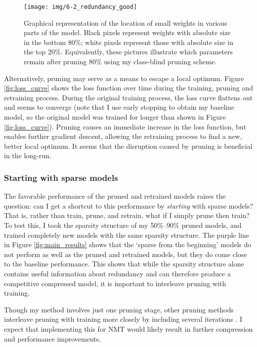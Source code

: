 \begin{figure}
\centering
\texttt{[image: img/6-2\_redundancy\_good]} %
\caption[Graphical representation of the location of small weights]{Graphical representation of the location of small weights in various parts of the model. 
Black pixels represent weights with absolute size in the bottom 80\%; white pixels represent those with absolute size in the top 20\%.
Equivalently, these pictures illustrate which parameters remain after pruning 80\% using my class-blind pruning scheme.
}
\label{fig:redundancy_location}
\end{figure}



Alternatively, pruning may serve as a means to escape a local optimum. 
Figure \ref{fig:loss_curve} shows the loss function over time during the training, pruning and retraining process.
During the original training process, the loss curve flattens out and seems to converge (note that I use early stopping to obtain my baseline model, so the original model was trained for longer than shown in Figure \ref{fig:loss_curve}).
Pruning causes an immediate increase in the loss function, but enables further gradient descent, allowing the retraining process to find a new, better local optimum.
It seems that the disruption caused by pruning is beneficial in the long-run.

\subsubsection{Starting with sparse models}
\label{subsec:sparse}
The favorable performance of the pruned and retrained models raises the question: can I get a shortcut to this performance by \emph{starting} with sparse models?
That is, rather than train, prune, and retrain, what if I simply prune then train?
To test this, I took the sparsity structure of my 50\%--90\% pruned models, and trained completely new models with the same sparsity structure.
The purple line in Figure \ref{fig:main_results} shows that the `sparse from the beginning' models do not perform as well as the pruned and retrained models, but they do come close to the baseline performance.
This shows that while the sparsity structure alone contains useful information about redundancy and can therefore produce a competitive compressed model, it is important to interleave pruning with training.

Though my method involves just one pruning stage, other pruning methods interleave pruning with training more closely by including several iterations \cite{collins2014memory,han2015learning}.
I expect that implementing this for NMT would likely result in further compression and performance improvements.



